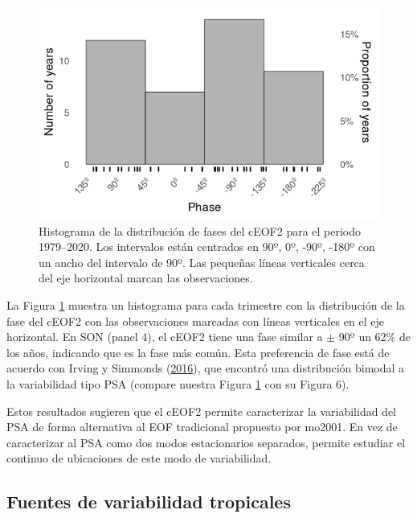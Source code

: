 \documentclass[12pt,oneside,a4paper]{reedthesis}
\begin{document}
\begin{figure}

{\centering \includegraphics{figures/20-ceofs/phase-histogram-1} 

}

\caption{Histograma de la distribución de fases del cEOF2 para el periodo 1979--2020.
Los intervalos están centrados en 90º, 0º, -90º, -180º con un ancho del intervalo de 90º.
Las pequeñas líneas verticales cerca del eje horizontal marcan las observaciones.}\label{fig:phase-histogram}
\end{figure}

La Figura \ref{fig:phase-histogram} muestra un histograma para cada trimestre con la distribución de la fase del cEOF2 con las observaciones marcadas con líneas verticales en el eje horizontal.
En SON (panel 4), el cEOF2 tiene una fase similar a \(\pm\) 90º un 62\% de los años, indicando que es la fase más común.
Esta preferencia de fase está de acuerdo con Irving y Simmonds (\protect\hyperlink{ref-irving2016}{2016}), que encontró una distribución bimodal a la variabilidad tipo PSA (compare nuestra Figura \ref{fig:phase-histogram} con su Figura 6).

Estos resultados sugieren que el cEOF2 permite caracterizar la variabilidad del PSA de forma alternativa al EOF tradicional propuesto por mo2001.
En vez de caracterizar al PSA como dos modos estacionarios separados, permite estudiar el continuo de ubicaciones de este modo de variabilidad.

\hypertarget{fuentes-ceof}{%
\subsection{Fuentes de variabilidad tropicales}\label{fuentes-ceof}}
\end{document}
